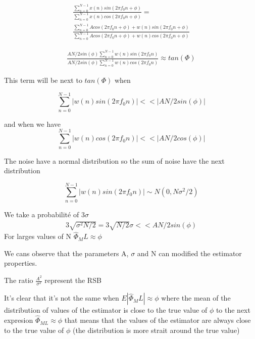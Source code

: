 \documentclass{report}
\begin{document}
\begin{gather*}
\frac{\sum_{n=0}^{N-1}x(n)sin(2\pi f_0n+\phi)}{\sum_{n=0}^{N-1}x(n)cos(2\pi f_0n+\phi)} = \\
\frac{\sum_{n=0}^{N-1}Acos(2\pi f_0n+\phi)+w(n)sin(2\pi f_0n+\phi)}{\sum_{n=0}^{N-1}Acos(2\pi f_0n+\phi)+w(n)cos(2\pi f_0n+\phi)}
\end{gather*}



\begin{gather*}
\frac{AN/2 sin(\phi)\sum_{n=0}^{N-1}w(n)sin(2\pi f_0n)}{AN/2 sin(\phi)\sum_{n=0}^{N-1}w(n)cos(2\pi f_0n)} \approx tan(\Phi)
\end{gather*}

This term will be next to $tan(\Phi)$ when 

\begin{equation}\label{key}
\sum_{n=0}^{N-1}|w(n)sin(2\pi f_0n)|<<|AN/2 sin(\phi)|
\end{equation}

and when we have 
\begin{equation}\label{key}
\sum_{n=0}^{N-1}|w(n)cos(2\pi f_0n)|<<|AN/2 cos(\phi)|
\end{equation}

The noise have a normal distribution so the sum of noise have the next distribution

\begin{equation}\label{key}
\sum_{n=0}^{N-1}|w(n)sin(2\pi f_0n)|\sim \textit{N}(0,N\sigma^2/2)
\end{equation}


We take a probabilité of 3$\sigma$
\begin{gather*}\label{key}
3\sqrt{\sigma^2 N/2} = 3\sqrt{N/2}\sigma << AN/2 sin(\phi)
\end{gather*}
For larges values of N $ \hat{\Phi}_ML \approx \phi $

We cans observe that the parameters A, $ \sigma $ and N can modified
the estimator properties.

The ratio $ \frac{A^2}{\sigma^2} $ represent the RSB %


It's clear that it's not the same when $ E|\hat{\Phi}_ML| \approx \phi $  where 
the mean of the distribution of values of the estimator is close to the true 
value of $ \phi $ to the next expresion $ \hat{\Phi}_{ML} \approx \phi $ that 
means that the values of the estimator are always close to the true value of $ 
\phi $ (the distribution is more strait around the true value)
\end{document}
